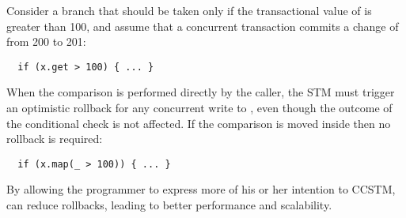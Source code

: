 Consider a branch that should be taken only if the transactional value of
 is greater than 100, and assume that a concurrent transaction commits
a change of  from 200 to 201:
\lstset{numbers=none}
\begin{lstlisting}
  if (x.get > 100) { ... }
\end{lstlisting}
\lstset{numbers=left}
When the comparison is performed directly by the caller, the STM must
trigger an optimistic rollback for any concurrent write to , even
though
the outcome of the conditional check is not affected.  If the comparison is
moved inside  then no rollback is required:
\lstset{numbers=none}
\begin{lstlisting}
  if (x.map(_ > 100)) { ... }
\end{lstlisting}
\lstset{numbers=left}
By allowing the programmer to express more of his or her intention to CCSTM,
 can reduce rollbacks, leading to better performance and scalability.

